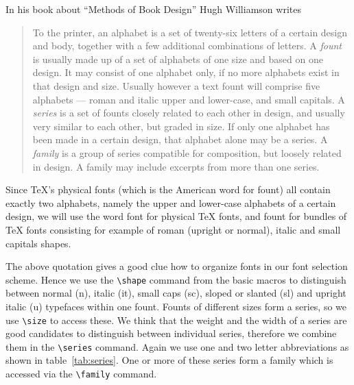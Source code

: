  In his book about ``Methods of Book Design'' Hugh Williamson writes
 \cite{Williamson}
 \begin{quote}
   \missing
   To the printer, an alphabet is a set of twenty-six letters of a
   certain design and body, together with a few additional
   combinations of letters. A {\em fount\/} is usually made up of a
   set of alphabets of one size and based on one design. It may
   consist of one alphabet only, if no more alphabets exist in that
   design and size.  Usually however a text fount will comprise five
   alphabets --- roman and italic upper and lower-case, and small
   capitals.
   \missing
   A {\em series\/} is a set of founts closely related to each other
   in design, and usually very similar to each other, but graded in
   size.  If only one alphabet has been made in a certain design, that
   alphabet alone may be a series.  A {\em family\/} is a group of
   series compatible for composition, but loosely related in design.  A
   family may include excerpts from more than one series.
 \end{quote}
 
 Since \TeX{}'s physical fonts (which is the American word for
 fount) all contain exactly two alphabets, namely the upper and
 lower-case alphabets of a certain design, we will use the word font
 for physical \TeX{} fonts, and fount for bundles of \TeX{} fonts
 consisting for example of roman (upright or normal), italic and small
 capitals shapes.
 
 The above quotation gives a good clue how to organize fonts in our
 font selection scheme.  Hence we use the \verb+\shape+ command from
 the basic macros to distinguish between normal (n), italic (it),
 small caps (sc), sloped or slanted (sl) and upright italic (u)
 typefaces within one fount.  Founts of different sizes form a series,
 so we use \verb+\size+ to access these.  We think that the weight and
 the width of a series are good candidates to distinguish between
 individual series, therefore we combine them in the \verb+\series+
 command.  Again we use one and two letter abbreviations as shown in
 table~\ref{tab:series}.  One or more of these series form a family
 which is accessed via the \verb+\family+ command.
 
